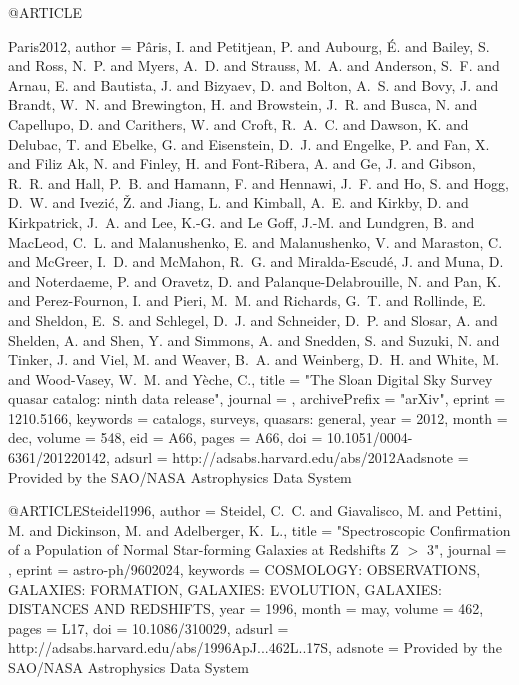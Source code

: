 \documentclass{aa}
\begin{document}
{{{{{{{{{{{{@ARTICLE{Paris2012,
   author = {{P{\^a}ris}, I. and {Petitjean}, P. and {Aubourg}, {\'E}. and 
	{Bailey}, S. and {Ross}, N.~P. and {Myers}, A.~D. and {Strauss}, M.~A. and 
	{Anderson}, S.~F. and {Arnau}, E. and {Bautista}, J. and {Bizyaev}, D. and 
	{Bolton}, A.~S. and {Bovy}, J. and {Brandt}, W.~N. and {Brewington}, H. and 
	{Browstein}, J.~R. and {Busca}, N. and {Capellupo}, D. and {Carithers}, W. and 
	{Croft}, R.~A.~C. and {Dawson}, K. and {Delubac}, T. and {Ebelke}, G. and 
	{Eisenstein}, D.~J. and {Engelke}, P. and {Fan}, X. and {Filiz Ak}, N. and 
	{Finley}, H. and {Font-Ribera}, A. and {Ge}, J. and {Gibson}, R.~R. and 
	{Hall}, P.~B. and {Hamann}, F. and {Hennawi}, J.~F. and {Ho}, S. and 
	{Hogg}, D.~W. and {Ivezi{\'c}}, {\v Z}. and {Jiang}, L. and 
	{Kimball}, A.~E. and {Kirkby}, D. and {Kirkpatrick}, J.~A. and 
	{Lee}, K.-G. and {Le Goff}, J.-M. and {Lundgren}, B. and {MacLeod}, C.~L. and 
	{Malanushenko}, E. and {Malanushenko}, V. and {Maraston}, C. and 
	{McGreer}, I.~D. and {McMahon}, R.~G. and {Miralda-Escud{\'e}}, J. and 
	{Muna}, D. and {Noterdaeme}, P. and {Oravetz}, D. and {Palanque-Delabrouille}, N. and 
	{Pan}, K. and {Perez-Fournon}, I. and {Pieri}, M.~M. and {Richards}, G.~T. and 
	{Rollinde}, E. and {Sheldon}, E.~S. and {Schlegel}, D.~J. and 
	{Schneider}, D.~P. and {Slosar}, A. and {Shelden}, A. and {Shen}, Y. and 
	{Simmons}, A. and {Snedden}, S. and {Suzuki}, N. and {Tinker}, J. and 
	{Viel}, M. and {Weaver}, B.~A. and {Weinberg}, D.~H. and {White}, M. and 
	{Wood-Vasey}, W.~M. and {Y{\`e}che}, C.},
    title = "{The Sloan Digital Sky Survey quasar catalog: ninth data release}",
  journal = {\aap},
archivePrefix = "arXiv",
   eprint = {1210.5166},
 keywords = {catalogs, surveys, quasars: general},
     year = 2012,
    month = dec,
   volume = 548,
      eid = {A66},
    pages = {A66},
      doi = {10.1051/0004-6361/201220142},
   adsurl = {http://adsabs.harvard.edu/abs/2012Aadsnote = {Provided by the SAO/NASA Astrophysics Data System}
}

@ARTICLE{Steidel1996,
   author = {{Steidel}, C.~C. and {Giavalisco}, M. and {Pettini}, M. and 
	{Dickinson}, M. and {Adelberger}, K.~L.},
    title = "{Spectroscopic Confirmation of a Population of Normal Star-forming Galaxies at Redshifts Z $\gt$ 3}",
  journal = {\apjl},
   eprint = {astro-ph/9602024},
 keywords = {COSMOLOGY: OBSERVATIONS, GALAXIES: FORMATION, GALAXIES: EVOLUTION, GALAXIES: DISTANCES AND REDSHIFTS},
     year = 1996,
    month = may,
   volume = 462,
    pages = {L17},
      doi = {10.1086/310029},
   adsurl = {http://adsabs.harvard.edu/abs/1996ApJ...462L..17S},
  adsnote = {Provided by the SAO/NASA Astrophysics Data System}
}

}}}}}}}}}}}}}
\end{document}
